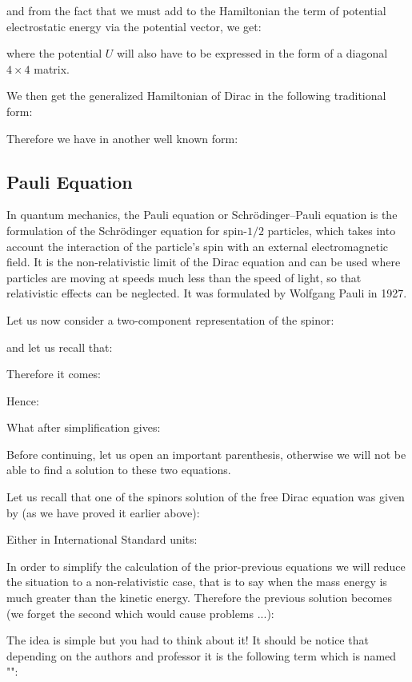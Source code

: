 	and from the fact that we must add to the Hamiltonian the term of potential electrostatic energy via the potential vector, we get:
	
	where the potential $U$ will also have to be expressed in the form of a diagonal $4\times 4$ matrix.

	We then get the generalized Hamiltonian of Dirac in the following traditional form:
	
	Therefore we have in another well known form:
	
	
	\pagebreak
	\subsection{Pauli Equation}\label{pauli equation}
	In quantum mechanics, the Pauli equation or Schrödinger–Pauli equation is the formulation of the Schrödinger equation for spin-$1/2$ particles, which takes into account the interaction of the particle's spin with an external electromagnetic field. It is the non-relativistic limit of the Dirac equation and can be used where particles are moving at speeds much less than the speed of light, so that relativistic effects can be neglected. It was formulated by Wolfgang Pauli in 1927.
	
	Let us now consider a two-component representation of the spinor:
	
	and let us recall that:
	
	Therefore it comes:
	
	Hence:
	
	What after simplification gives:
	
	Before continuing, let us open an important parenthesis, otherwise we will not be able to find a solution to these two equations.

	Let us recall that one of the spinors solution of the free Dirac equation was given by (as we have proved it earlier above):
	
	Either in International Standard units:
	
	In order to simplify the calculation of the prior-previous equations we will reduce the situation to a non-relativistic case, that is to say when the mass energy is much greater than the kinetic energy. Therefore the previous solution becomes (we forget the second which would cause problems ...):
	
	The idea is simple but you had to think about it! It should be notice that depending on the authors and professor it is the following term which is named "":

